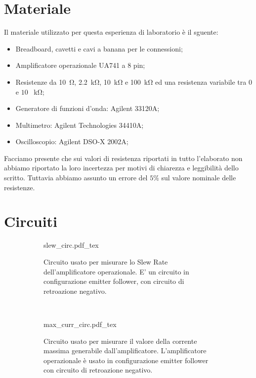\section*{Materiale}

Il materiale utilizzato per questa esperienza di laboratorio è il sguente:

\begin{itemize} \itemsep2pt \parskip0pt 
    \item{Breadboard, cavetti e cavi a banana per le connessioni;}
    \item{Amplificatore operazionale UA741 a 8 pin;}
    \item{Resistenze da \SI{10}{\ohm}, \SI{2.2}{\kilo\ohm}, \SI{10}{\kilo\ohm} e \SI{100}{\kilo\ohm} ed una resistenza variabile tra $0$ e $10$ \SI{}{\kilo\ohm};}
    \item{Generatore di funzioni d'onda: Agilent 33120A;}
    \item{Multimetro: Agilent Technologies 34410A;}
    \item{Oscilloscopio: Agilent DSO-X 2002A;}
\end{itemize}

Facciamo presente che sui valori di resistenza riportati in tutto l'elaborato non abbiamo riportato la loro incertezza per motivi di chiarezza e leggibilità dello scritto. Tuttavia abbiamo assunto un errore del $5\%$ sul valore nominale delle resistenze.

\section*{Circuiti}

\begin{figure}[h]
        \centering
        \begin{subfigure}[b]{0.45\textwidth}
        	\def\svgwidth{\textwidth}
                {slew_circ.pdf_tex}
                \caption{Circuito usato per misurare lo Slew Rate dell'amplificatore operazionale. E' un circuito in configurazione emitter follower, con circuito di retroazione negativo.}
                \label{fig:slew_rate}
        \end{subfigure}
        ~
        \begin{subfigure}[b]{0.45\textwidth}
        	\def\svgwidth{\textwidth}
                {max_curr_circ.pdf_tex}
                \caption{Circuito usato per misurare il valore della corrente massima generabile dall'amplificatore. L'amplificatore operazionale è usato in configurazione emitter follower con circuito di retroazione negativo.}
                \label{fig:current}
        \end{subfigure}
        \caption{}
\end{figure}
